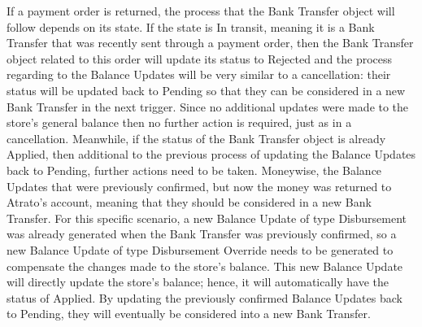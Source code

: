 If a payment order is returned, the process that the Bank Transfer object will follow depends on its state. If the state is In transit, meaning it is a Bank Transfer that was recently sent through a payment order, then the Bank Transfer object related to this order will update its status to Rejected and the process regarding to the Balance Updates will be very similar to a cancellation: their status will be updated back to Pending so that they can be considered in a new Bank Transfer in the next trigger. Since no additional updates were made to the store’s general balance then no further action is required, just as in a cancellation. 
Meanwhile, if the status of the Bank Transfer object is already Applied, then additional to the previous process of updating the Balance Updates back to Pending, further actions need to be taken. Moneywise, the Balance Updates that were previously confirmed, but now the money was returned to Atrato’s account, meaning that they should be considered in a new Bank Transfer. 
For this specific scenario, a new Balance Update of type Disbursement was already generated when the Bank Transfer was previously confirmed, so a new Balance Update of type Disbursement Override needs to be generated to compensate the changes made to the store’s balance. This new Balance Update will directly update the store’s balance; hence, it will automatically have the status of Applied. 
By updating the previously confirmed Balance Updates back to Pending, they will eventually be considered into a new Bank Transfer.


